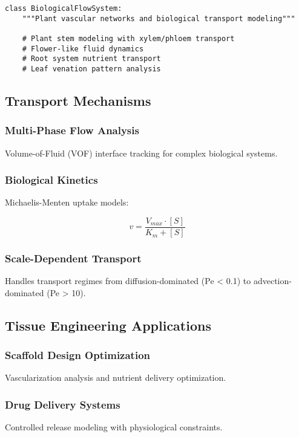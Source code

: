 \documentclass[11pt,a4paper]{article}
\begin{document}
\begin{lstlisting}[caption=Biological Flow System Architecture]
class BiologicalFlowSystem:
    """Plant vascular networks and biological transport modeling"""

    # Plant stem modeling with xylem/phloem transport
    # Flower-like fluid dynamics
    # Root system nutrient transport
    # Leaf venation pattern analysis
\end{lstlisting}

\subsection{Transport Mechanisms}

\subsubsection{Multi-Phase Flow Analysis}
Volume-of-Fluid (VOF) interface tracking for complex biological systems.

\subsubsection{Biological Kinetics}
Michaelis-Menten uptake models:

\begin{equation}
v = \frac{V_{max} \cdot [S]}{K_m + [S]}
\label{eq:michaelis_menten}
\end{equation}

\subsubsection{Scale-Dependent Transport}
Handles transport regimes from diffusion-dominated (Pe < 0.1) to advection-dominated (Pe > 10).

\subsection{Tissue Engineering Applications}

\subsubsection{Scaffold Design Optimization}
Vascularization analysis and nutrient delivery optimization.

\subsubsection{Drug Delivery Systems}
Controlled release modeling with physiological constraints.
\end{document}
